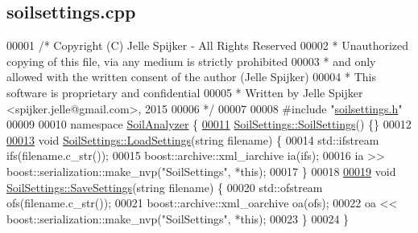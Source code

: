 \hypertarget{soilsettings_8cpp_source}{}\subsection{soilsettings.\+cpp}
\label{soilsettings_8cpp_source}

\begin{DoxyCode}
00001 \textcolor{comment}{/* Copyright (C) Jelle Spijker - All Rights Reserved}
00002 \textcolor{comment}{ * Unauthorized copying of this file, via any medium is strictly prohibited}
00003 \textcolor{comment}{ * and only allowed with the written consent of the author (Jelle Spijker)}
00004 \textcolor{comment}{ * This software is proprietary and confidential}
00005 \textcolor{comment}{ * Written by Jelle Spijker <spijker.jelle@gmail.com>, 2015}
00006 \textcolor{comment}{ */}
00007 
00008 \textcolor{preprocessor}{#include "\hyperlink{soilsettings_8h}{soilsettings.h}"}
00009 
00010 \textcolor{keyword}{namespace }\hyperlink{namespace_soil_analyzer}{SoilAnalyzer} \{
\hypertarget{soilsettings_8cpp_source_l00011}{}\hyperlink{class_soil_analyzer_1_1_soil_settings_ab8359b9a5ea27e6296e79a82789c8719}{00011} \hyperlink{class_soil_analyzer_1_1_soil_settings_ab8359b9a5ea27e6296e79a82789c8719}{SoilSettings::SoilSettings}() \{\}
00012 
\hypertarget{soilsettings_8cpp_source_l00013}{}\hyperlink{class_soil_analyzer_1_1_soil_settings_a438bf660eeb7a49a676eef5da129f8d5}{00013} \textcolor{keywordtype}{void} \hyperlink{class_soil_analyzer_1_1_soil_settings_a438bf660eeb7a49a676eef5da129f8d5}{SoilSettings::LoadSettings}(\textcolor{keywordtype}{string} filename) \{
00014   std::ifstream ifs(filename.c\_str());
00015   boost::archive::xml\_iarchive ia(ifs);
00016   ia >> boost::serialization::make\_nvp(\textcolor{stringliteral}{"SoilSettings"}, *\textcolor{keyword}{this});
00017 \}
00018 
\hypertarget{soilsettings_8cpp_source_l00019}{}\hyperlink{class_soil_analyzer_1_1_soil_settings_ab211c361df454e8e1e29a4bddedeba81}{00019} \textcolor{keywordtype}{void} \hyperlink{class_soil_analyzer_1_1_soil_settings_ab211c361df454e8e1e29a4bddedeba81}{SoilSettings::SaveSettings}(\textcolor{keywordtype}{string} filename) \{
00020   std::ofstream ofs(filename.c\_str());
00021   boost::archive::xml\_oarchive oa(ofs);
00022   oa << boost::serialization::make\_nvp(\textcolor{stringliteral}{"SoilSettings"}, *\textcolor{keyword}{this});
00023 \}
00024 \}
\end{DoxyCode}
